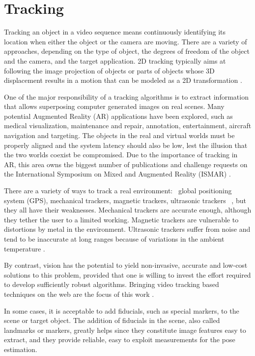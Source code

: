 
\section{Tracking} %
\label{sec:basic_concepts:augmented_reality_tracking}

Tracking an object in a video sequence means continuously identifying its location when either the object or the camera are moving. There are a variety of approaches, depending on the type of object, the degrees of freedom of the object and the camera, and the target application.
2D tracking typically aims at following the image projection of objects or parts of objects whose 3D displacement results in a motion that can be modeled as a 2D transformation \cite{Lepetit2005}.

One of the major responsibility of a tracking algorithms is to extract information that allows superposing computer generated images on real scenes. Many potential Augmented Reality (AR) applications have been explored, such as medical visualization, maintenance and repair, annotation, entertainment, aircraft navigation and targeting. The objects in the real and virtual worlds must be properly aligned and the system latency should also be low, lest the illusion that the two worlds coexist be compromised. \cite{Lepetit2005} Due to the importance of tracking in AR, this area owns the biggest number of publications and challenge requests on the International Symposium on Mixed and Augmented Reality (ISMAR) \cite{Zhou2008}.

There are a variety of ways to track a real environment: \eg\ global positioning system (GPS), mechanical trackers, magnetic trackers, ultrasonic trackers \etc\ \cite{Krevelen2010}, but they all have their weaknesses. Mechanical trackers are accurate enough, although they tether the user to a limited working. Magnetic trackers are vulnerable to distortions by metal in the environment. Ultrasonic trackers suffer from noise and tend to be inaccurate at long ranges because of variations in the ambient temperature \cite{Lepetit2005}.

By contrast, vision has the potential to yield non-invasive, accurate and low-cost solutions to this problem, provided that one is willing to invest the effort required to develop sufficiently robust algorithms. Bringing video tracking based techniques on the web are the focus of this work \cite{Lepetit2005}.

In some cases, it is acceptable to add fiducials, such as special markers, to the scene or target object. The addition of fiducials in the scene, also called landmarks or markers, greatly helps since they constitute image features easy to extract, and they provide reliable, easy to exploit measurements for the pose estimation.


